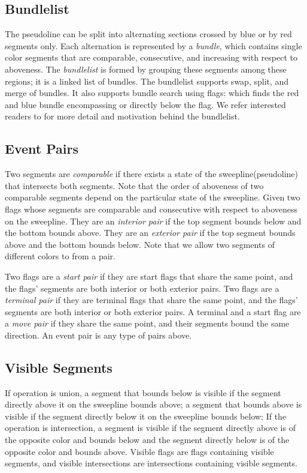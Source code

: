 \documentclass[11pt]{article}
\begin{document}
\subsection{Bundlelist}
The pseudoline can be split into alternating sections crossed by blue or by red segments only.
Each alternation is represented by a \textit{bundle}, which contains single color segments that are comparable, consecutive, and increasing with respect to aboveness.
The \textit{bundlelist} is formed by grouping these segments among these regions; it is a linked list of bundles.
The bundlelist supports swap, split, and merge of bundles.
It also supports bundle search using flags: which finds the red and blue bundle encompassing or directly below the flag.
We refer interested readers to \cite{MS} for more detail and motivation behind the bundlelist.

\subsection{Event Pairs}
Two segments are \textit{comparable} if there exists a state of the sweepline(pseudoline) that intersects both segments.
Note that the order of aboveness of two comparable segments depend on the particular state of the sweepline.
Given two flags whose segments are comparable and consecutive with respect to aboveness on the sweepline.
They are an \textit{interior pair} if the top segment bounds below and the bottom bounds above.
They are an \textit{exterior pair} if the top segment bounds above and the bottom bounds below.
Note that we allow two segments of different colors to from a pair.

Two flags are a \textit{start pair} if they are start flags that share the same point, and the flags' segments are both interior or both exterior pairs.
Two flags are a \textit{terminal pair} if they are terminal flags that share the same point, and the flags' segments are both interior or both exterior pairs.
A terminal and a start flag are a \textit{move pair} if they share the same point, and their segments bound the same direction.
An event pair is any type of pairs above.

\subsection{Visible Segments}
If operation is union, a segment that bounds below is visible if the segment directly above it on the sweepline bounds above; a segment that bounds above is visible if the segment directly below it on the sweepline bounds below;
If the operation is intersection, a segment is visible if the segment directly above is of the opposite color and bounds below and the segment directly below is of the opposite color and bounds above.
Visible flags are flags containing visible segments, and visible intersections are intersections containing visible segments.
\end{document}
